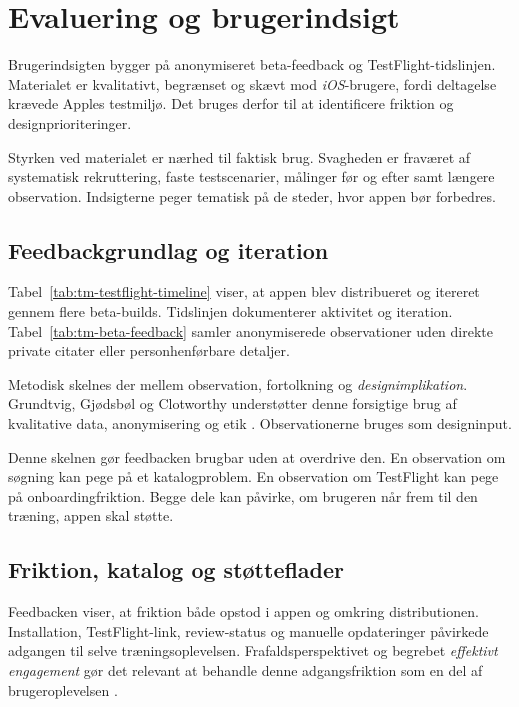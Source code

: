 \section{Evaluering og brugerindsigt}

Brugerindsigten bygger på anonymiseret beta-feedback og TestFlight-tidslinjen. Materialet er kvalitativt, begrænset og skævt mod \emph{iOS}-brugere, fordi deltagelse krævede Apples testmiljø. Det bruges derfor til at identificere friktion og designprioriteringer.

Styrken ved materialet er nærhed til faktisk brug. Svagheden er fraværet af systematisk rekruttering, faste testscenarier, målinger før og efter samt længere observation. Indsigterne peger tematisk på de steder, hvor appen bør forbedres.

\subsection{Feedbackgrundlag og iteration}

Tabel~\ref{tab:tm-testflight-timeline} viser, at appen blev distribueret og itereret gennem flere beta-builds. Tidslinjen dokumenterer aktivitet og iteration. Tabel~\ref{tab:tm-beta-feedback} samler anonymiserede observationer uden direkte private citater eller personhenførbare detaljer.

Metodisk skelnes der mellem observation, fortolkning og \emph{designimplikation}. Grundtvig, Gjødsbøl og Clotworthy understøtter denne forsigtige brug af kvalitative data, anonymisering og etik \cite{grundtvig2025_analyse_data,gjoedsboel_grundtvig2025_interview,clotworthy2025_etik_kvalitet_forskning}. Observationerne bruges som designinput.

Denne skelnen gør feedbacken brugbar uden at overdrive den. En observation om søgning kan pege på et katalogproblem. En observation om TestFlight kan pege på onboardingfriktion. Begge dele kan påvirke, om brugeren når frem til den træning, appen skal støtte.

\subsection{Friktion, katalog og støtteflader}

Feedbacken viser, at friktion både opstod i appen og omkring distributionen. Installation, TestFlight-link, review-status og manuelle opdateringer påvirkede adgangen til selve træningsoplevelsen. Frafaldsperspektivet og begrebet \emph{effektivt engagement} gør det relevant at behandle denne adgangsfriktion som en del af brugeroplevelsen \cite{eysenbach2005_law_of_attrition,yardley2016_effective_engagement_dbci}.

